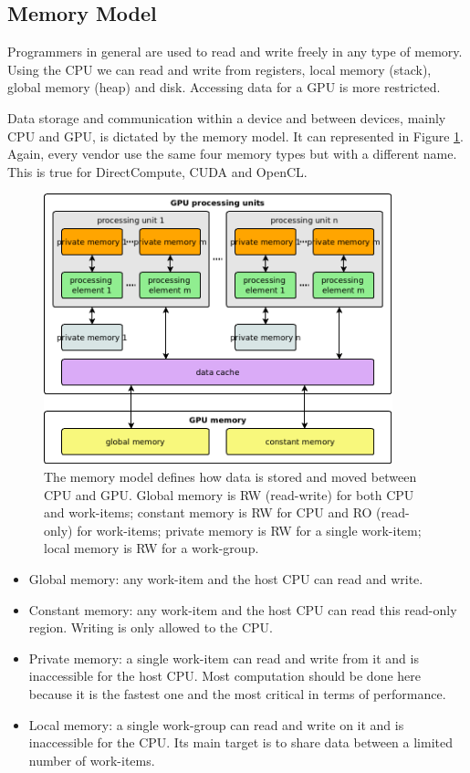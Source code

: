 \documentclass{article}
\begin{document}
\subsection{Memory Model}

Programmers in general are used to read and write freely in any type of memory. Using the CPU we can read and write from registers, local memory (stack), global memory (heap) and disk. Accessing data for a GPU is more restricted.

Data storage and communication within a device and between devices, mainly CPU and GPU, is dictated by the memory model. It can represented in Figure \ref{figure:memory}. Again, every vendor use the same four memory types but with a different name. This is true for DirectCompute, CUDA and OpenCL.

\begin{figure}[!ht]
\centering
\includegraphics[width=0.9\textwidth]{memory}
\caption{The memory model defines how data is stored and moved between CPU and GPU. Global memory is RW (read-write) for both CPU and work-items; constant memory is RW for CPU and RO (read-only) for work-items; private memory is RW for a single work-item; local memory is RW for a work-group.}
\label{figure:memory}
\end{figure}

\begin{itemize}
\item Global memory: any work-item and the host CPU can read and write.
\item Constant memory: any work-item and the host CPU can read this read-only region. Writing is only allowed to the CPU.
\item Private memory: a single work-item can read and write from it and is inaccessible for the host CPU. Most computation should be done here because it is the fastest one and the most critical in terms of performance.
\item Local memory: a single work-group can read and write on it and is inaccessible for the CPU. Its main target is to share data between a limited number of work-items.
\end{itemize}
\end{document}
